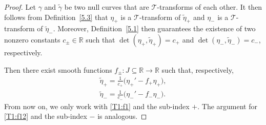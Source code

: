 \documentclass[pdftex]{sigma}
\numberwithin{equation}{section}
\def\R{\mathbb{R}}
\begin{document}
\begin{proof} Let $\gamma$ and $\widetilde{\gamma}$ be two null curves that are $\mathcal{T}$-transforms of each other. It then follows from Definition~\ref{5.3} that $\eta_+$ is a $\mathcal{T}$-transform of $\widetilde{\eta}_+$ and $\eta_-$ is a $\mathcal{T}$-transform of $\widetilde{\eta}_-$. Moreover, Defi\-ni\-tion~\ref{5.1} then guarantees the existence of two nonzero constants $c_\pm\in\R$ such that ${\det (\eta_+,\widetilde{\eta}_+)=c_+}$ and $\det (\eta_-,\widetilde{\eta}_-)=c_-$, respectively.
	
	Then there exist smooth functions $f_{\pm}\colon J\subseteq\R\longrightarrow \R$ such that, respectively,
	\begin{gather}
		\widetilde{\eta}_+=\frac{1}{c_+}\bigl(\eta_+'-f_+\eta_+\bigr),\label{T1:f1}\\
		\widetilde{\eta}_-=\frac{1}{c_-}\bigl(\eta_-'-f_-\eta_-\bigr).\label{T1:f12}
	\end{gather}
	From now on, we only work with \eqref{T1:f1} and the sub-index $+$. The argument for \eqref{T1:f12} and the sub-index $-$ is analogous.
	

\end{proof}
\end{document}
